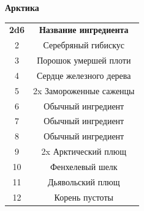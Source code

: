 \documentclass[a4paper, 9pt, twocolumn]{book}
\begin{document}
	\begin{table}[H]
		
		{\Large \textbf{Арктика}}
		
		\medspace 
		
		\centering 
		
		\begin{tabularx}{\linewidth}{c C}
			
			\textbf{2d6} & \textbf{Название ингредиента} \\
			
			2 & Серебряный гибискус \\
			
			3 & Порошок умершей плоти \\
			
			4 & Сердце железного дерева \\
			
			5 & 2x Замороженные саженцы \\
			
			6 & Обычный ингредиент \\
			
			7 & Обычный ингредиент \\
			
			8 & Обычный ингредиент \\
			
			9 & 2x Арктический плющ \\
			
			10 & Фенхелевый шелк \\
			
			11 & Дьявольский плющ \\
			
			12 & Корень пустоты
		\end{tabularx}
	\end{table}
\end{document}
